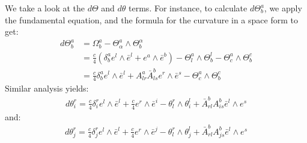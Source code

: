 \begin{remark}  We take a look at the $d \Theta$ and $d \theta$ terms.  For instance, to calculate $d \Theta^a_b$, we apply the fundamental equation, and the formula for the curvature in a space form to get:
%
\begin{align*}
d \Theta^a_b &= \Omega^a_b - \Theta^a_{\alpha} \wedge \Theta^{\alpha}_b \\
&= \frac{c}{4}( \delta^a_b e^l \wedge \bar{e}^l + e^a \wedge \bar{e}^b ) - \Theta^a_l \wedge \Theta^l_b - \Theta^a_c \wedge \Theta^c_b \\
&= \frac{c}{4} \delta^a_b e^l \wedge \bar{e}^l + A^a_{lr} \bar{A}^b_{ls} e^r \wedge \bar{e}^s - \Theta^a_c \wedge \Theta^c_b
\end{align*}
%
Similar analysis yields:
%
\begin{align*}
d \theta^r_i = \frac{c}{4} \delta^r_i e^l \wedge \bar{e}^l + \frac{c}{4} e^r \wedge \bar{e}^i - \theta^r_l \wedge \theta^l_i + \bar{A}^b_{rl} A^b_{is} \bar{e}^l \wedge e^s
\end{align*}
%
and:
%
\begin{align*}
d \theta^r_j = \frac{c}{4} \delta^r_j e^l \wedge \bar{e}^l + \frac{c}{4} e^r \wedge \bar{e}^j - \theta^r_l \wedge \theta^l_j + \bar{A}^b_{rl} A^b_{js} \bar{e}^l \wedge e^s
\end{align*}
%
\end{remark}

\bigskip

